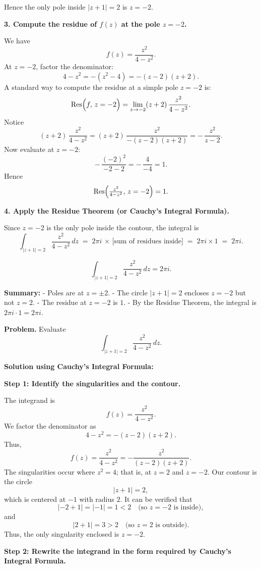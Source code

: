 \documentclass[12pt]{article}
\theoremstyle{definition} %
\theoremstyle{plain} %
\begin{document}
Hence the only pole inside \(\lvert z+1\rvert=2\) is \(z=-2\).

\textbf{3. Compute the residue of \(f(z)\) at the pole \(z=-2\).}

We have 
\[
f(z) = \frac{z^2}{4 - z^2}.
\]
At \(z=-2\), factor the denominator:
\[
4 - z^2 = -(z^2 - 4) = -(z-2)(z+2).
\]
A standard way to compute the residue at a simple pole \(z=-2\) is:
\[
\operatorname{Res}\Bigl(f,\,z=-2\Bigr)
= \lim_{z\to -2} (z+2)\,\frac{z^2}{4 - z^2}.
\]
Notice
\[
(z+2)\,\frac{z^2}{4 - z^2}
= (z+2)\,\frac{z^2}{-(z-2)(z+2)}
= -\,\frac{z^2}{z-2}.
\]
Now evaluate at \(z=-2\):
\[
-\,\frac{(-2)^2}{-2 - 2}
= -\,\frac{4}{-4}
= 1.
\]
Hence
\[
\operatorname{Res}\Bigl(\tfrac{z^2}{4 - z^2},\,z=-2\Bigr) = 1.
\]

\textbf{4. Apply the Residue Theorem (or Cauchy’s Integral Formula).}

Since \(z=-2\) is the only pole inside the contour, the integral is
\[
\int_{\lvert z+1\rvert=2} \frac{z^2}{4 - z^2}\,dz
\;=\;
2\pi i \,\times\, \bigl[\text{sum of residues inside}\bigr]
\;=\;
2\pi i \times 1
\;=\;
2\pi i.
\]

\[
\boxed{ \int_{\lvert z+1\rvert=2} \frac{z^2}{4 - z^2}\,dz = 2\pi i. }
\]

\textbf{Summary:}
- Poles are at \(z=\pm2\).
- The circle \(\lvert z+1\rvert=2\) encloses \(z=-2\) but not \(z=2\).
- The residue at \(z=-2\) is \(1\).
- By the Residue Theorem, the integral is \(2\pi i\cdot1 = 2\pi i\).


\textbf{Problem.} Evaluate
\[
\int_{\lvert z+1\rvert=2} \frac{z^2}{4-z^2}\,dz.
\]

\textbf{Solution using Cauchy's Integral Formula:}

\textbf{Step 1: Identify the singularities and the contour.} 

The integrand is
\[
f(z)=\frac{z^2}{4-z^2}.
\]
We factor the denominator as
\[
4-z^2 = -(z-2)(z+2).
\]
Thus,
\[
f(z) = \frac{z^2}{4-z^2} = -\frac{z^2}{(z-2)(z+2)}.
\]
The singularities occur where \(z^2=4\); that is, at \(z=2\) and \(z=-2\).  
Our contour is the circle
\[
\lvert z+1\rvert=2,
\]
which is centered at \(-1\) with radius \(2\). It can be verified that
\[
\lvert -2+1\rvert = \lvert -1\rvert = 1 < 2 \quad \text{(so \(z=-2\) is inside)},
\]
and
\[
\lvert 2+1\rvert = 3 > 2 \quad \text{(so \(z=2\) is outside)}.
\]
Thus, the only singularity enclosed is \(z=-2\).

\textbf{Step 2: Rewrite the integrand in the form required by Cauchy's Integral Formula.}
\end{document}
